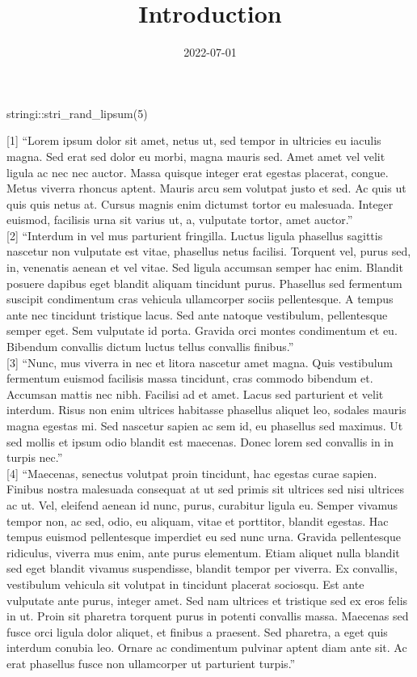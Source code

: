 \documentclass[
  12pt,
]{article}
\title{Introduction}
\author{}
\date{\vspace{-2.5em}2022-07-01}
\newenvironment{Shaded}{\begin{snugshade}}{\end{snugshade}}
\newcommand{\DecValTok}[1]{\textcolor[rgb]{0.00,0.00,0.81}{#1}}
\newcommand{\FunctionTok}[1]{\textcolor[rgb]{0.00,0.00,0.00}{#1}}
\newcommand{\NormalTok}[1]{#1}
\newcommand{\SpecialCharTok}[1]{\textcolor[rgb]{0.00,0.00,0.00}{#1}}
\begin{document}
\maketitle

\begin{Shaded}
\begin{Highlighting}[]
\NormalTok{stringi}\SpecialCharTok{::}\FunctionTok{stri\_rand\_lipsum}\NormalTok{(}\DecValTok{5}\NormalTok{)}
\end{Highlighting}
\end{Shaded}

{[}1{]} ``Lorem ipsum dolor sit amet, netus ut, sed tempor in ultricies eu iaculis magna. Sed erat sed dolor eu morbi, magna mauris sed. Amet amet vel velit ligula ac nec nec auctor. Massa quisque integer erat egestas placerat, congue. Metus viverra rhoncus aptent. Mauris arcu sem volutpat justo et sed. Ac quis ut quis quis netus at. Cursus magnis enim dictumst tortor eu malesuada. Integer euismod, facilisis urna sit varius ut, a, vulputate tortor, amet auctor.''\\
{[}2{]} ``Interdum in vel mus parturient fringilla. Luctus ligula phasellus sagittis nascetur non vulputate est vitae, phasellus netus facilisi. Torquent vel, purus sed, in, venenatis aenean et vel vitae. Sed ligula accumsan semper hac enim. Blandit posuere dapibus eget blandit aliquam tincidunt purus. Phasellus sed fermentum suscipit condimentum cras vehicula ullamcorper sociis pellentesque. A tempus ante nec tincidunt tristique lacus. Sed ante natoque vestibulum, pellentesque semper eget. Sem vulputate id porta. Gravida orci montes condimentum et eu. Bibendum convallis dictum luctus tellus convallis finibus.''\\
{[}3{]} ``Nunc, mus viverra in nec et litora nascetur amet magna. Quis vestibulum fermentum euismod facilisis massa tincidunt, cras commodo bibendum et. Accumsan mattis nec nibh. Facilisi ad et amet. Lacus sed parturient et velit interdum. Risus non enim ultrices habitasse phasellus aliquet leo, sodales mauris magna egestas mi. Sed nascetur sapien ac sem id, eu phasellus sed maximus. Ut sed mollis et ipsum odio blandit est maecenas. Donec lorem sed convallis in in turpis nec.''\\
{[}4{]} ``Maecenas, senectus volutpat proin tincidunt, hac egestas curae sapien. Finibus nostra malesuada consequat at ut sed primis sit ultrices sed nisi ultrices ac ut. Vel, eleifend aenean id nunc, purus, curabitur ligula eu. Semper vivamus tempor non, ac sed, odio, eu aliquam, vitae et porttitor, blandit egestas. Hac tempus euismod pellentesque imperdiet eu sed nunc urna. Gravida pellentesque ridiculus, viverra mus enim, ante purus elementum. Etiam aliquet nulla blandit sed eget blandit vivamus suspendisse, blandit tempor per viverra. Ex convallis, vestibulum vehicula sit volutpat in tincidunt placerat sociosqu. Est ante vulputate ante purus, integer amet. Sed nam ultrices et tristique sed ex eros felis in ut. Proin sit pharetra torquent purus in potenti convallis massa. Maecenas sed fusce orci ligula dolor aliquet, et finibus a praesent. Sed pharetra, a eget quis interdum conubia leo. Ornare ac condimentum pulvinar aptent diam ante sit. Ac erat phasellus fusce non ullamcorper ut parturient turpis.''
\end{document}
